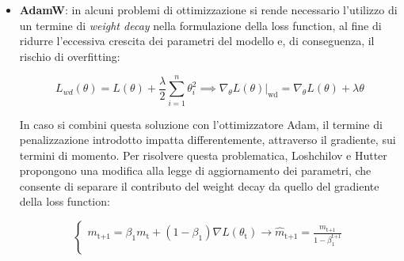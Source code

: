 \begin{itemize}
\begin{equation}
\begin{cases}
                    \theta_{\text{t+1}} = \displaystyle \theta_{\text{t}} - \frac{\eta}{\sqrt{\hat{v}_{\text{t+1}}} + \epsilon} \cdot \hat{m}_{\text{t+1}}
                \end{cases}
                \label{eq:Adam}
            \end{equation} 

        Naturalmente, un simile approccio non si rivela essere esente da criticità. L'efficacia dell'algoritmo, infatti, dipende fortemente dalla selezione degli iperparametri introdotti, quali il learning rate, i coefficienti di decadimento e la costante $\epsilon$. Inoltre, la convergenza dell'algoritmo non è garantita a livello teorico, e le prestazioni non risultano identiche per ogni architettura neurale. Ad ogni modo, l'elevata velocità di convergenza e la maggiore stabilità rispetto ad altri metodi di ottimizzazione, hanno reso Adam uno degli algoritmi più diffusi per l'addestramento di reti neurali.
             
        \item \textbf{AdamW}\cite{AdamW_medium}: in alcuni problemi di ottimizzazione si rende necessario l'utilizzo di un termine di \emph{weight decay} nella formulazione della loss function, al fine di ridurre l'eccessiva crescita dei parametri del modello e, di conseguenza, il rischio di overfitting:
        
            \begin{equation}
                L_{wd}(\theta) = \displaystyle L(\theta) + \frac{\lambda}{2} \sum_{i=1}^{n} \theta_{i}^{2} \implies \nabla_{\theta} L(\theta) |_{\text{wd}} = \nabla_{\theta} L(\theta) + \lambda \theta
                \label{eq:weight_decay}
            \end{equation}

        In caso si combini questa soluzione con l'ottimizzatore Adam, il termine di penalizzazione introdotto impatta differentemente, attraverso il gradiente, sui termini di momento. Per risolvere questa problematica, Loshchilov e Hutter\cite{AdamW} propongono una modifica alla legge di aggiornamento dei parametri, che consente di separare il contributo del weight decay da quello del gradiente della loss function:

            \begin{equation}
                \begin{cases}
                    m_{\text{t+1}} = \displaystyle \beta_{1} m_{\text{t}} + (1 - \beta_{1}) \nabla L(\theta_{\text{t}}) \rightarrow \hat{m}_{\text{t+1}} = \frac{m_{\text{t+1}}}{1 - \beta_{1}^{\text{t+1}}}  \\[0.35cm]


\end{cases}
\end{equation}
\end{itemize}
